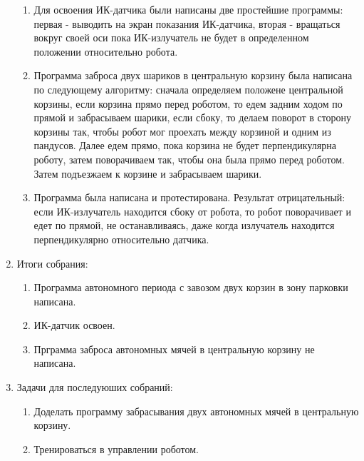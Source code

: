 \begin{enumerate}
\begin{enumerate}
		\item Для освоения ИК-датчика были написаны две простейшие программы: первая - выводить на экран показания ИК-датчика, вторая - вращаться вокруг своей оси пока ИК-излучатель не будет в определенном положении относительно робота.  
		
		\item Программа заброса двух шариков в центральную корзину была написана по следующему алгоритму: сначала определяем положене центральной корзины, если корзина прямо перед роботом, то едем задним ходом по прямой и забрасываем шарики, если сбоку, то делаем поворот в сторону корзины так, чтобы робот мог проехать между корзиной и одним из пандусов. Далее едем прямо, пока корзина не будет перпендикулярна роботу, затем поворачиваем так, чтобы она была прямо перед роботом. Затем подъезжаем к корзине и забрасываем шарики.
		
		\item Программа была написана и протестирована. Результат отрицательный: если ИК-излучатель находится сбоку от робота, то робот поворачивает и едет по прямой, не останавливаясь, даже когда излучатель находится перпендикулярно относительно датчика.   
	\end{enumerate}
	\item Итоги собрания:
	\begin{enumerate}
		\item Программа автономного периода с завозом двух корзин в зону парковки написана.
		
		\item ИК-датчик освоен.
		
		\item Прграмма заброса автономных мячей в центральную корзину не написана.
	\end{enumerate}
	\item Задачи для последуюших собраний:
	\begin{enumerate}
		\item Доделать программу забрасывания двух автономных мячей в центральную корзину.
		
		\item Тренироваться в управлении роботом.
	\end{enumerate}
\end{enumerate}
\fillpage